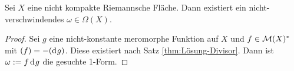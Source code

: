 \begin{cor}
  \label{cor:nicht-verschwindende-1-form}
  Sei $X$ eine nicht kompakte Riemannsche Fläche. 
  Dann existiert ein nicht-verschwindendes $\omega \in \Omega(X)$.
\end{cor}

\begin{proof}
  Sei $g$ eine nicht-konstante meromorphe Funktion auf $X$ und $f \in
  \mathcal{M}(X)^\ast$ mit $(f) = -(\d[g])$. Diese existiert nach Satz
  \ref{thm:Lösung-Divisor}. Dann ist $\omega := f \d[g]$ die gesuchte 1-Form.
\end{proof}


